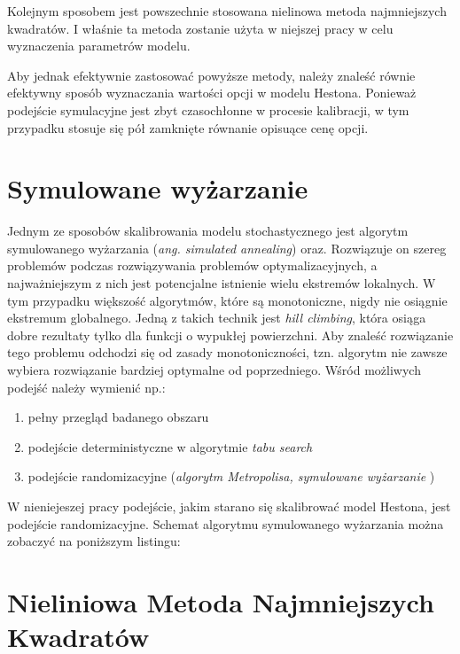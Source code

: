 \documentclass{pracamgr}
\begin{document}
Kolejnym sposobem jest powszechnie stosowana nielinowa metoda najmniejszych kwadratów. I właśnie ta metoda zostanie użyta
w niejszej pracy w celu wyznaczenia parametrów modelu.

Aby jednak efektywnie zastosować powyższe metody, należy znaleść równie efektywny sposób wyznaczania wartości opcji w modelu Hestona. Ponieważ podejście symulacyjne jest zbyt czasochłonne w procesie kalibracji, w tym przypadku stosuje się pół zamknięte równanie opisuące cenę opcji.

\section{Symulowane wyżarzanie}

Jednym ze sposobów skalibrowania modelu stochastycznego jest algorytm symulowanego wyżarzania  (\textit{ang. simulated annealing}) oraz. Rozwiązuje on szereg problemów podczas rozwiązywania problemów optymalizacyjnych, a najważniejszym z nich jest potencjalne istnienie wielu ekstremów lokalnych.
W tym przypadku większość algorytmów, które są monotoniczne, nigdy nie osiągnie ekstremum globalnego. Jedną z takich technik jest \textit{hill climbing}, która osiąga dobre rezultaty tylko dla funkcji o wypukłej powierzchni. Aby znaleść rozwiązanie tego problemu odchodzi się od zasady monotoniczności, tzn. algorytm nie zawsze wybiera rozwiązanie bardziej optymalne od poprzedniego. 
Wśród możliwych podejść należy wymienić np.:
\begin{enumerate}
  \item pełny przegląd badanego obszaru
  \item podejście deterministyczne w algorytmie \textit{tabu search}
  \item podejście randomizacyjne (\textit{algorytm Metropolisa, symulowane wyżarzanie} \cite{OptimalizationBySimulatedAnnealing} )
\end{enumerate}


W nieniejeszej pracy podejście, jakim starano się skalibrować model Hestona, jest podejście randomizacyjne.
Schemat algorytmu symulowanego wyżarzania można zobaczyć na poniższym listingu:



\section{Nieliniowa Metoda Najmniejszych Kwadratów}
\end{document}

